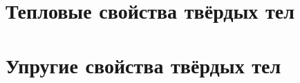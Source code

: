 \section{Тепловые свойства твёрдых тел}\label{sec:thermal}





\section{Упругие свойства твёрдых тел}\label{sec:elastic}




